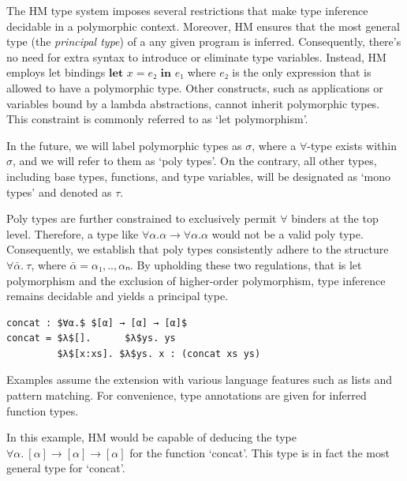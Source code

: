 \documentclass[runningheads]{llncs}
\newcommand{\kwlet}{\textbf{let }}
\newcommand{\kwin}{\textbf{ in }}
\begin{document}
The HM type system imposes several restrictions that make type
inference decidable in a polymorphic context. Moreover, HM ensures that the
most general type (the \emph{principal type}) of a any given program is
inferred.
Consequently, there's no need for extra syntax to introduce or eliminate type
variables.
Instead, HM employs let bindings $\kwlet x = e₂ \kwin e₁$ where $e₂$ is the
only expression that is allowed to have a polymorphic type.
Other constructs, such as applications or variables bound by a lambda
abstractions, cannot inherit polymorphic types.
This constraint is commonly referred to as `let polymorphism'.

In the future, we will label polymorphic types as $σ$, where a $∀$-type exists
within $σ$, and we will refer to them as `poly types'.
On the contrary, all other types, including base
types, functions, and type variables, will be designated as `mono types' and
denoted as $τ$.

Poly types are further constrained to exclusively permit $∀$ binders at the top
level.
Therefore, a type like $∀α. α → ∀α. α$ would not be a valid poly type.
Consequently, we establish that poly types consistently adhere to the structure
$∀\bar{α}. \ τ$, where $\bar{α} = α₁,..,αₙ$.
By upholding these two regulations, that is let polymorphism and the exclusion
of
higher-order polymorphism, type inference remains decidable and
yields a principal type.
\begin{example}
  \begin{lstlisting}
concat : $∀α.$ $[α] → [α] → [α]$
concat = $λ$[].      $λ$ys. ys           
         $λ$[x:xs]. $λ$ys. x : (concat xs ys)   
  \end{lstlisting}
\end{example}
Examples assume the extension with various language features such as
lists and pattern matching.
For convenience, type annotations are given for inferred function types.

In this example, HM would be capable of deducing the type $∀α.\ [α] → [α] →
  [α]$
for the function `concat'.
This type is in fact the most general type for `concat'.
\end{document}
